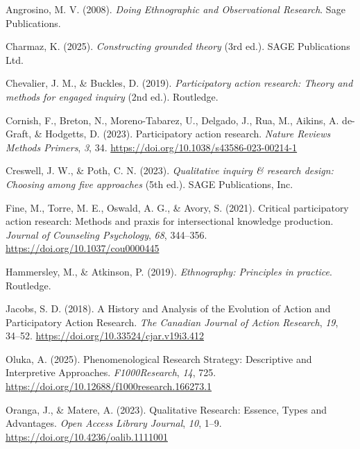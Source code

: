 \documentclass[
  indonesian,
  letterpaper,
  DIV=11,
  numbers=noendperiod]{scrreprt}
\newlength{\cslhangindent}
\newenvironment{CSLReferences}[2] %
 {\begin{list}{}{%
  \setlength{\itemindent}{0pt}
  \setlength{\leftmargin}{0pt}
  \setlength{\parsep}{0pt}
  \ifodd #1
   \setlength{\leftmargin}{\cslhangindent}
   \setlength{\itemindent}{-1\cslhangindent}
  \fi
  \setlength{\itemsep}{#2\baselineskip}}}
 {\end{list}}
\begin{document}
\label{refs--17}
\begin{CSLReferences}{1}{0}
Angrosino, M. V. (2008). \emph{Doing Ethnographic and Observational
Research}. Sage Publications.

Charmaz, K. (2025). \emph{Constructing grounded theory} (3rd ed.). SAGE
Publications Ltd.

Chevalier, J. M., \& Buckles, D. (2019). \emph{Participatory action
research: Theory and methods for engaged inquiry} (2nd ed.). Routledge.

Cornish, F., Breton, N., Moreno-Tabarez, U., Delgado, J., Rua, M.,
Aikins, A. de-Graft, \& Hodgetts, D. (2023). Participatory action
research. \emph{Nature Reviews Methods Primers}, \emph{3}, 34.
\url{https://doi.org/10.1038/s43586-023-00214-1}

Creswell, J. W., \& Poth, C. N. (2023). \emph{Qualitative inquiry \&
research design: Choosing among five approaches} (5th ed.). SAGE
Publications, Inc.

Fine, M., Torre, M. E., Oswald, A. G., \& Avory, S. (2021). Critical
participatory action research: Methods and praxis for intersectional
knowledge production. \emph{Journal of Counseling Psychology},
\emph{68}, 344--356. \url{https://doi.org/10.1037/cou0000445}

Hammersley, M., \& Atkinson, P. (2019). \emph{Ethnography: Principles in
practice}. Routledge.

Jacobs, S. D. (2018). A History and Analysis of the Evolution of Action
and Participatory Action Research. \emph{The Canadian Journal of Action
Research}, \emph{19}, 34--52.
\url{https://doi.org/10.33524/cjar.v19i3.412}

Oluka, A. (2025). Phenomenological Research Strategy: Descriptive and
Interpretive Approaches. \emph{F1000Research}, \emph{14}, 725.
\url{https://doi.org/10.12688/f1000research.166273.1}

Oranga, J., \& Matere, A. (2023). Qualitative Research: Essence, Types
and Advantages. \emph{Open Access Library Journal}, \emph{10}, 1--9.
\url{https://doi.org/10.4236/oalib.1111001}


\end{CSLReferences}
\end{document}

